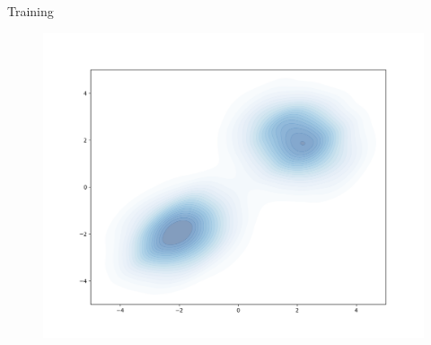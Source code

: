 \documentclass[aspectratio=169,xcolor=dvipsnames]{beamer}
\begin{document}
\begin{frame}{Training}
  \begin{figure}
    \includegraphics[height=0.8\textheight]{figs/gen/gaussian_mixture_training_data}
  \end{figure}
\end{frame}
\end{document}

